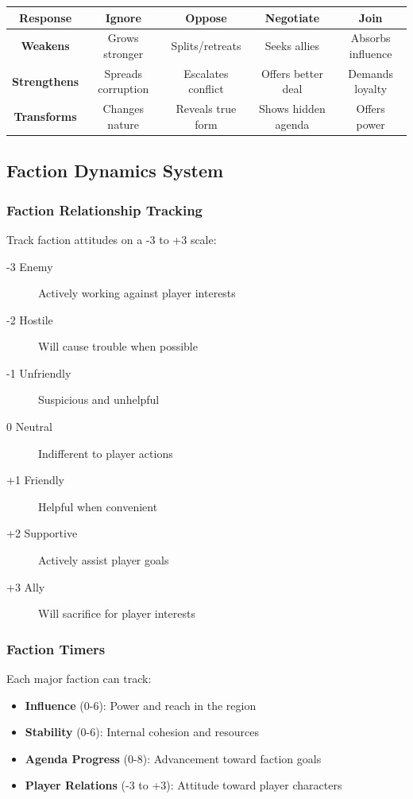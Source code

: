 \documentclass[11pt]{article}
\begin{document}
\begin{center}
\begin{longtable}{|c|c|c|c|c|}
\hline
\textbf{Response} & \textbf{Ignore} & \textbf{Oppose} & \textbf{Negotiate} & \textbf{Join} \\
\hline
\textbf{Weakens} & Grows stronger & Splits/retreats & Seeks allies & Absorbs influence \\
\hline
\textbf{Strengthens} & Spreads corruption & Escalates conflict & Offers better deal & Demands loyalty \\
\hline
\textbf{Transforms} & Changes nature & Reveals true form & Shows hidden agenda & Offers power \\
\hline
\end{longtable}
\end{center}

\subsection{Faction Dynamics System}

\subsubsection{Faction Relationship Tracking}

Track faction attitudes on a -3 to +3 scale:

\begin{description}
  \item[-3 Enemy] Actively working against player interests
  \item[-2 Hostile] Will cause trouble when possible
  \item[-1 Unfriendly] Suspicious and unhelpful
  \item[0 Neutral] Indifferent to player actions
  \item[+1 Friendly] Helpful when convenient
  \item[+2 Supportive] Actively assist player goals
  \item[+3 Ally] Will sacrifice for player interests
\end{description}

\subsubsection{Faction Timers}

Each major faction can track:

\begin{itemize}
  \item \textbf{Influence} (0-6): Power and reach in the region
  \item \textbf{Stability} (0-6): Internal cohesion and resources
  \item \textbf{Agenda Progress} (0-8): Advancement toward faction goals
  \item \textbf{Player Relations} (-3 to +3): Attitude toward player characters
\end{itemize}
\end{document}
